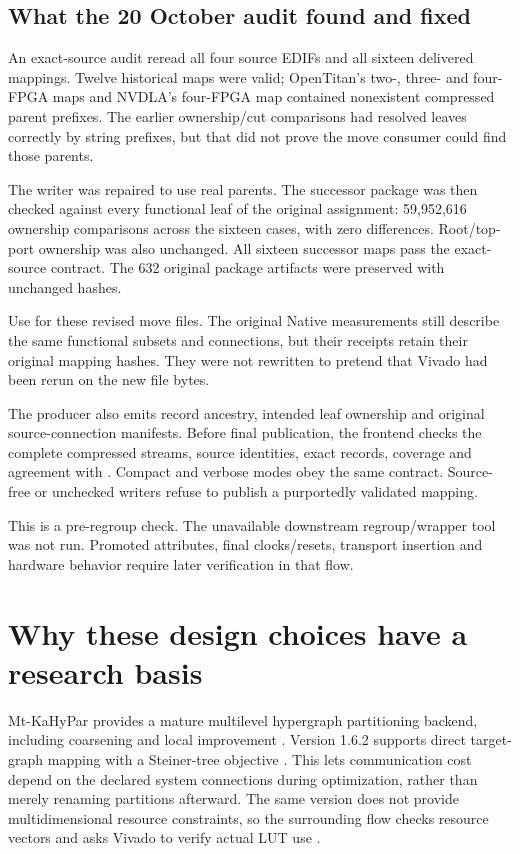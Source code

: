 \documentclass[11pt]{article}
\newcommand{\code}[1]{\texttt{\detokenize{#1}}}
\begin{document}
\subsection{What the 20 October audit found and fixed}

An exact-source audit reread all four source EDIFs and all sixteen delivered mappings. Twelve historical maps were valid; OpenTitan's two-, three- and four-FPGA maps and NVDLA's four-FPGA map contained nonexistent compressed parent prefixes. The earlier ownership/cut comparisons had resolved leaves correctly by string prefixes, but that did not prove the move consumer could find those parents.

The writer was repaired to use real parents. The successor package was then checked against every functional leaf of the original assignment: 59,952,616 ownership comparisons across the sixteen cases, with zero differences. Root/top-port ownership was also unchanged. All sixteen successor maps pass the exact-source contract. The 632 original package artifacts were preserved with unchanged hashes.

Use \code{RESULTS FOR J4/CONTRACT_COMPLIANT_20261020} for these revised move files. The original Native measurements still describe the same functional subsets and connections, but their receipts retain their original mapping hashes. They were not rewritten to pretend that Vivado had been rerun on the new file bytes.

The producer also emits record ancestry, intended leaf ownership and original source-connection manifests. Before final publication, the frontend checks the complete compressed streams, source identities, exact records, coverage and agreement with \code{cells.txt}. Compact and verbose modes obey the same contract. Source-free or unchecked writers refuse to publish a purportedly validated mapping.

This is a pre-regroup check. The unavailable downstream regroup/wrapper tool was not run. Promoted attributes, final clocks/resets, transport insertion and hardware behavior require later verification in that flow.

\section{Why these design choices have a research basis}

Mt-KaHyPar provides a mature multilevel hypergraph partitioning backend, including coarsening and local improvement \cite{mtpaper}. Version 1.6.2 supports direct target-graph mapping with a Steiner-tree objective \cite{mtdocs,steiner}. This lets communication cost depend on the declared system connections during optimization, rather than merely renaming partitions afterward. The same version does not provide multidimensional resource constraints, so the surrounding flow checks resource vectors and asks Vivado to verify actual LUT use \cite{mtformats}.
\end{document}
